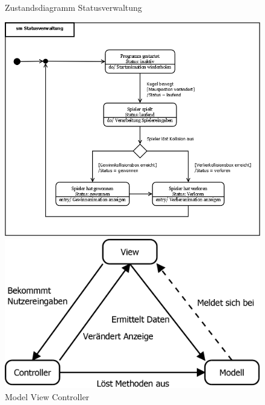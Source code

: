 \begin{figure}[H]
\centering
\caption{Zustandsdiagramm Statusverwaltung}
\includegraphics[scale=0.35]{Bilder/Diagramme/smStatusverwaltung.png}

\caption{Model View Controller}
\label{Abb:MVC}
\includegraphics[scale=0.5]{Bilder/Diagramme/MVC.png}

\end{figure}